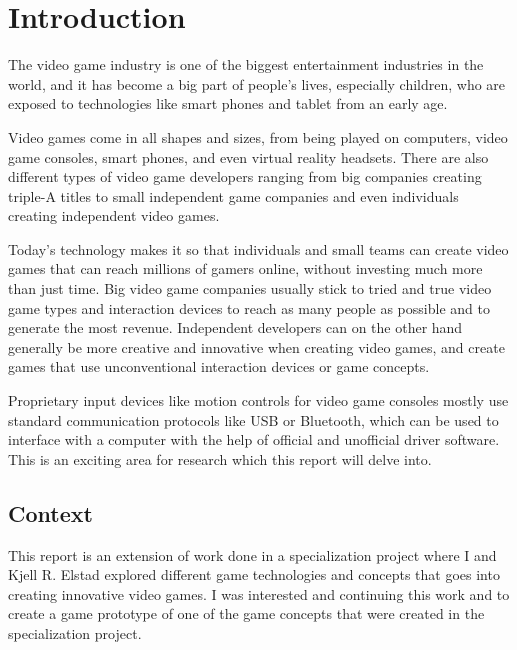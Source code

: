 \chapter{Introduction}
The video game industry is one of the biggest entertainment industries in the world, and it has become a big part of people's lives, especially children, who are exposed to technologies like smart phones and tablet from an early age. 

Video games come in all shapes and sizes, from being played on computers, video game consoles, smart phones, and even virtual reality headsets. There are also different types of video game developers ranging from big companies creating triple-A titles to small independent game companies and even individuals creating independent video games. 

Today's technology makes it so that individuals and small teams can create video games that can reach millions of gamers online, without investing much more than just time. Big video game companies usually stick to tried and true video game types and interaction devices to reach as many people as possible and to generate the most revenue. Independent developers can on the other hand generally be more creative and innovative when creating video games, and create games that use unconventional interaction devices or game concepts.

Proprietary input devices like motion controls for video game consoles mostly use standard communication protocols like USB or Bluetooth, which can be used to interface with a computer with the help of official and unofficial driver software. This is an exciting area for research which this report will delve into.

%

\section{Context}
This report is an extension of work done in a specialization project where I and Kjell R. Elstad explored different game technologies and concepts that goes into creating innovative video games. I was interested and continuing this work and to create a game prototype of one of the game concepts that were created in the specialization project.


